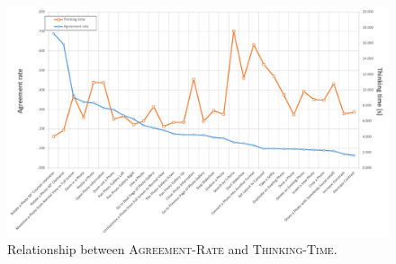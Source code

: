 \begin{figure}[ht]
	\centering
	\captionsetup{justification=centering}
	\includegraphics[width=\linewidth]{Figures/App-LUIGES/thinking-time.pdf}
	\vspace{-15pt}
	\caption{Relationship between \textsc{Agreement-Rate} and \textsc{Thinking-Time}.}
	\label{fig:thinking-time}
	\vspace{-8pt}
\end{figure}




